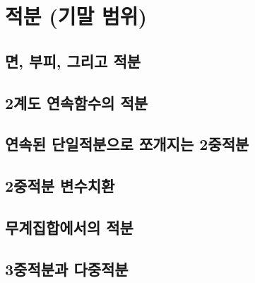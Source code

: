 \section{적분 (기말 범위)}
\subsection{면, 부피, 그리고 적분}
\subsection{2계도 연속함수의 적분}
\subsection{연속된 단일적분으로 쪼개지는 2중적분}
\subsection{2중적분 변수치환}
\subsection{무계집합에서의 적분}
\subsection{3중적분과 다중적분}
